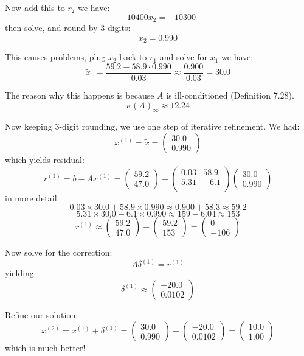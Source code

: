 \documentclass[12pt]{article} %
\newcommand{\ka}{\kappa}
\newcommand{\1}[1]{\mathds{1}\left[#1\right]}
\begin{document}
Now add this to $r_2$ we have:
$$
	-10400x_2 = -10300
$$ then solve, and round by 3 digits:
$$
	\tilde{x}_2 = 0.990
$$

This causes problems, plug $\tilde{x}_2$ back to $r_1$ and solve for $x_1$ we have:
$$
	\tilde{x}_1 = \frac{59.2 - 58.9 \cdot 0.990}{0.03} \approx \frac{0.900}{0.03} = 30.0
$$

The reason why this happens is because $A$ is ill-conditioned (Definition 7.28). 
$$
	\ka(A)_{\infty} \approx 12.24
$$


Now keeping 3-digit rounding, we use one step of iterative refinement. We had:
$$
	x^{(1)} =\tilde{x}= 
	\begin{pmatrix}
		30.0\\
		0.990
	\end{pmatrix}
$$ which yields residual:
$$
	r^{(1)} = b-Ax^{(1)} = 
	\begin{pmatrix}
		59.2 \\
		47.0
	\end{pmatrix}-\begin{pmatrix}
		0.03 & 58.9 \\
		5.31 & -6.1 \\
	\end{pmatrix}\begin{pmatrix}
		30.0\\
		0.990
	\end{pmatrix}
$$ in more detail:
$$
	0.03 \times 30.0 + 58.9 \times 0.990 \approx 0.900 + 58.3 \approx 59.2
$$
$$
	5.31 \times 30.0 -6.1 \times 0.990 \approx 159 - 6.04 \approx 153
$$
$$
	r^{(1)}\approx 
	\begin{pmatrix}
		59.2 \\
		47.0
	\end{pmatrix}-\begin{pmatrix}
		59.2\\
		153
	\end{pmatrix} = 
	\begin{pmatrix}
		0\\
		-106
	\end{pmatrix}
$$

Now solve for the correction:
$$
	A\delta^{(1)} = r^{(1)}
$$ yielding:
$$
	\delta^{(1)} \approx 
	\begin{pmatrix}
		-20.0\\
		0.0102
	\end{pmatrix}
$$ 

Refine our solution:
$$
	x^{(2)} = x^{(1)} + \delta^{(1)} = \begin{pmatrix}
		30.0\\
		0.990
	\end{pmatrix}+
	\begin{pmatrix}
		-20.0\\
		0.0102
	\end{pmatrix} =
	\begin{pmatrix}
		10.0\\
		1.00
	\end{pmatrix}
$$ which is much better!
\end{document}
